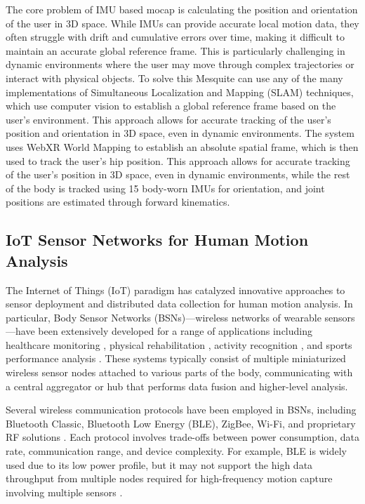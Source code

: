 \documentclass[lettersize,journal]{IEEEtran}
\begin{document}
The core problem of IMU based mocap is calculating the position and orientation of the user in 3D space. While IMUs can provide accurate local motion data, they often struggle with drift and cumulative errors over time, making it difficult to maintain an accurate global reference frame. This is particularly challenging in dynamic environments where the user may move through complex trajectories or interact with physical objects. To solve this Mesquite can use any of the many implementations of Simultaneous Localization and Mapping (SLAM) techniques, which use computer vision to establish a global reference frame based on the user's environment. This approach allows for accurate tracking of the user's position and orientation in 3D space, even in dynamic environments. The system uses WebXR World Mapping \cite{webxr, webxr-wm} to establish an absolute spatial frame, which is then used to track the user's hip position. This approach allows for accurate tracking of the user's position in 3D space, even in dynamic environments, while the rest of the body is tracked using 15 body-worn IMUs for orientation, and joint positions are estimated through forward kinematics.


\subsection{IoT Sensor Networks for Human Motion Analysis}

The Internet of Things (IoT) paradigm has catalyzed innovative approaches to sensor deployment and distributed data collection for human motion analysis. In particular, Body Sensor Networks (BSNs)—wireless networks of wearable sensors—have been extensively developed for a range of applications including healthcare monitoring \cite{pantelopoulos2010survey}, physical rehabilitation \cite{yang2014}, activity recognition \cite{lara2013survey}, and sports performance analysis \cite{baca2010sensor}. These systems typically consist of multiple miniaturized wireless sensor nodes attached to various parts of the body, communicating with a central aggregator or hub that performs data fusion and higher-level analysis.

Several wireless communication protocols have been employed in BSNs, including Bluetooth Classic, Bluetooth Low Energy (BLE), ZigBee, Wi-Fi, and proprietary RF solutions \cite{otanes2019}. Each protocol involves trade-offs between power consumption, data rate, communication range, and device complexity. For example, BLE is widely used due to its low power profile, but it may not support the high data throughput from multiple nodes required for high-frequency motion capture involving multiple sensors \cite{milenkovic2006wireless}.
\end{document}
